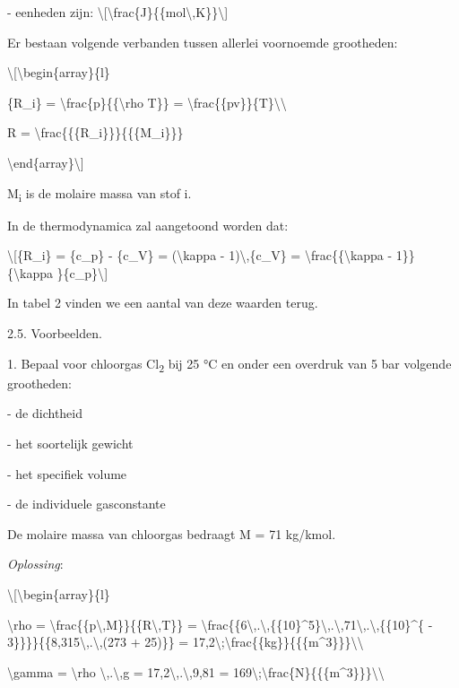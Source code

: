 \documentclass[]{article}
\begin{document}
- eenheden zijn:
\textbackslash{}{[}\textbackslash{}frac\{J\}\{\{mol\textbackslash{},K\}\}\textbackslash{}{]}

Er bestaan volgende verbanden tussen allerlei voornoemde grootheden:

\textbackslash{}{[}\textbackslash{}begin\{array\}\{l\}

\{R\_i\} = \textbackslash{}frac\{p\}\{\{\textbackslash{}rho T\}\} =
\textbackslash{}frac\{\{pv\}\}\{T\}\textbackslash{}\textbackslash{}

R = \textbackslash{}frac\{\{\{R\_i\}\}\}\{\{\{M\_i\}\}\}

\textbackslash{}end\{array\}\textbackslash{}{]}

M\textsubscript{i} is de molaire massa van stof i.

In de thermodynamica zal aangetoond worden dat:

\textbackslash{}{[}\{R\_i\} = \{c\_p\} - \{c\_V\} =
(\textbackslash{}kappa - 1)\textbackslash{},\{c\_V\} =
\textbackslash{}frac\{\{\textbackslash{}kappa -
1\}\}\{\textbackslash{}kappa \}\{c\_p\}\textbackslash{}{]}

In tabel 2 vinden we een aantal van deze waarden terug.

2.5. Voorbeelden.

1. Bepaal voor chloorgas Cl\textsubscript{2} bij 25 °C en onder een
overdruk van 5 bar volgende grootheden:

- de dichtheid

- het soortelijk gewicht

- het specifiek volume

- de individuele gasconstante

De molaire massa van chloorgas bedraagt M = 71 kg/kmol.

\emph{Oplossing}:

\textbackslash{}{[}\textbackslash{}begin\{array\}\{l\}

\textbackslash{}rho =
\textbackslash{}frac\{\{p\textbackslash{},M\}\}\{\{R\textbackslash{},T\}\}
=
\textbackslash{}frac\{\{6\textbackslash{},.\textbackslash{},\{\{10\}\^{}5\}\textbackslash{},.\textbackslash{},71\textbackslash{},.\textbackslash{},\{\{10\}\^{}\{
- 3\}\}\}\}\{\{8,315\textbackslash{},.\textbackslash{},(273 + 25)\}\} =
17,2\textbackslash{};\textbackslash{}frac\{\{kg\}\}\{\{\{m\^{}3\}\}\}\textbackslash{}\textbackslash{}

\textbackslash{}gamma = \textbackslash{}rho
\textbackslash{},.\textbackslash{},g =
17,2\textbackslash{},.\textbackslash{},9,81 =
169\textbackslash{};\textbackslash{}frac\{N\}\{\{\{m\^{}3\}\}\}\textbackslash{}\textbackslash{}
\end{document}
